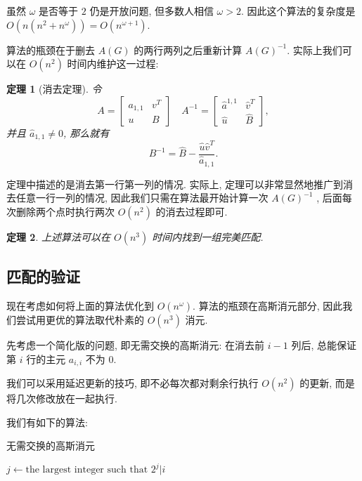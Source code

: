 \documentclass[a4paper]{article}
\newtheorem{theorem}{\hspace{2em}定理}
\begin{document}
			虽然 $\omega$ 是否等于 $2$ 仍是开放问题, 但多数人相信 $\omega > 2$. 因此这个算法的复杂度是 $O(n (n^2 + n^\omega)) = O(n^{\omega + 1})$.
			
			算法的瓶颈在于删去 $A(G)$ 的两行两列之后重新计算 $A(G)^{-1}$. 实际上我们可以在 $O(n^2)$ 时间内维护这一过程:

			\begin{theorem}[消去定理]
				令
				$$ A = \begin{bmatrix}
					a_{1, 1} & v^T \\
					u & B
				\end{bmatrix} \quad A^{-1} = \begin{bmatrix}
					\hat a^{1, 1} & \hat v^T \\
					\hat u & \hat B
				\end{bmatrix} , $$
				并且 $\hat a_{1, 1} \ne 0$, 那么就有
				$$ B^{-1} = \hat B - \frac {\hat u \hat v^T} {\hat a_{1, 1}}. $$
				\label{elimination}
			\end{theorem}

			定理中描述的是消去第一行第一列的情况. 实际上, 定理可以非常显然地推广到消去任意一行一列的情况, 因此我们只需在算法最开始计算一次 $A(G)^{-1}$ , 后面每次删除两个点时执行两次 $O(n^2)$ 的消去过程即可.

			\begin{theorem}
				上述算法可以在 $O(n^3)$ 时间内找到一组完美匹配.
			\end{theorem}

		\subsection{匹配的验证}

			\hspace{2em}现在考虑如何将上面的算法优化到 $O(n^\omega)$. 算法的瓶颈在高斯消元部分, 因此我们尝试用更优的算法取代朴素的 $O(n^3)$ 消元.

			先考虑一个简化版的问题, 即无需交换的高斯消元: 在消去前 $i - 1$ 列后, 总能保证第 $i$ 行的主元 $a_{i, i}$ 不为 $0$.

			我们可以采用延迟更新的技巧, 即不必每次都对剩余行执行 $O(n^2)$ 的更新, 而是将几次修改放在一起执行.

			我们有如下的算法:

			\begin{algorithm}
				\caption{无需交换的高斯消元}
				\label{simple}

				\begin{algorithmic}[1]
							\State $j \gets \text{the largest integer such that } 2^j | i$
						\EndFor
					\EndFunction
				\end{algorithmic}

			\end{algorithm}
\end{document}
